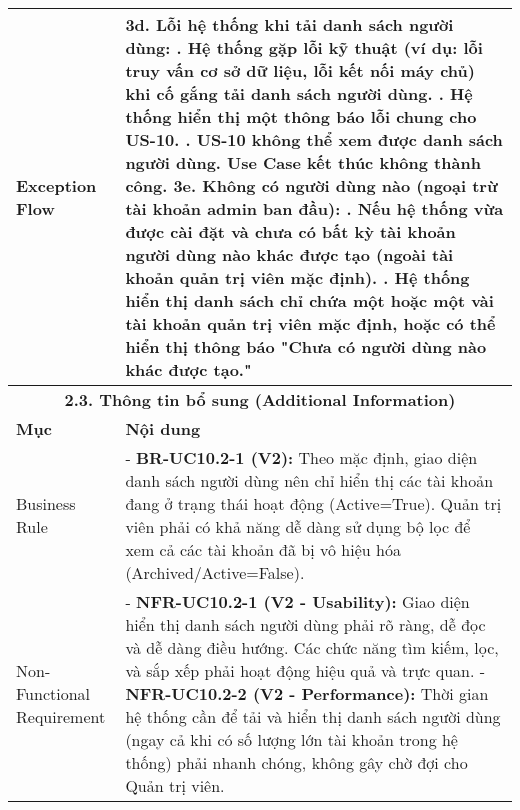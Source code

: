 \begin{longtable}{|m{4cm}|p{11cm}|}
\hline
Exception Flow & \textbf{3d. Lỗi hệ thống khi tải danh sách người dùng:} \newline    1. Hệ thống gặp lỗi kỹ thuật (ví dụ: lỗi truy vấn cơ sở dữ liệu, lỗi kết nối máy chủ) khi cố gắng tải danh sách người dùng. \newline    2. Hệ thống hiển thị một thông báo lỗi chung cho US-10. \newline    3. US-10 không thể xem được danh sách người dùng. Use Case kết thúc không thành công. \newline \textbf{3e. Không có người dùng nào (ngoại trừ tài khoản admin ban đầu):} \newline    1. Nếu hệ thống vừa được cài đặt và chưa có bất kỳ tài khoản người dùng nào khác được tạo (ngoài tài khoản quản trị viên mặc định). \newline    2. Hệ thống hiển thị danh sách chỉ chứa một hoặc một vài tài khoản quản trị viên mặc định, hoặc có thể hiển thị thông báo "Chưa có người dùng nào khác được tạo." \\
\hline
\multicolumn{2}{|c|}{\textbf{2.3. Thông tin bổ sung (Additional Information)}} \\
\hline
\textbf{Mục} & \textbf{Nội dung} \\
\hline
Business Rule & - \textbf{BR-UC10.2-1 (V2):} Theo mặc định, giao diện danh sách người dùng nên chỉ hiển thị các tài khoản đang ở trạng thái hoạt động (Active=True). Quản trị viên phải có khả năng dễ dàng sử dụng bộ lọc để xem cả các tài khoản đã bị vô hiệu hóa (Archived/Active=False). \\
\hline
Non-Functional Requirement & - \textbf{NFR-UC10.2-1 (V2 - Usability):} Giao diện hiển thị danh sách người dùng phải rõ ràng, dễ đọc và dễ dàng điều hướng. Các chức năng tìm kiếm, lọc, và sắp xếp phải hoạt động hiệu quả và trực quan. \newline - \textbf{NFR-UC10.2-2 (V2 - Performance):} Thời gian hệ thống cần để tải và hiển thị danh sách người dùng (ngay cả khi có số lượng lớn tài khoản trong hệ thống) phải nhanh chóng, không gây chờ đợi cho Quản trị viên. \\
\hline
\end{longtable}

